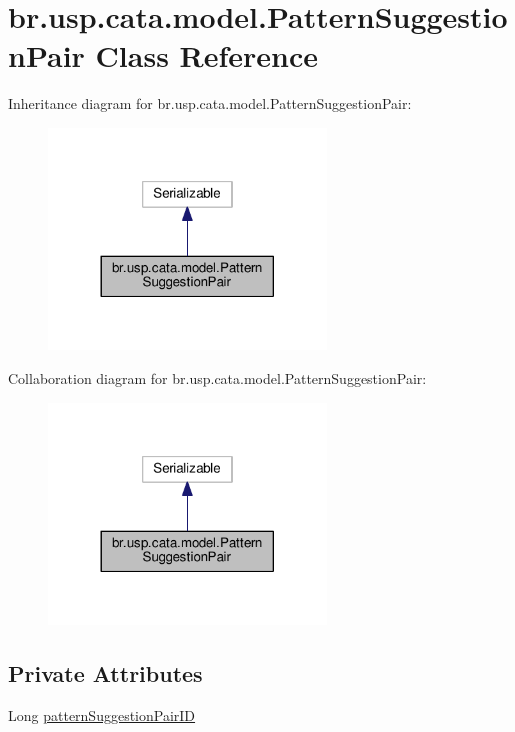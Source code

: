 \hypertarget{classbr_1_1usp_1_1cata_1_1model_1_1_pattern_suggestion_pair}{\section{br.\+usp.\+cata.\+model.\+Pattern\+Suggestion\+Pair Class Reference}
\label{classbr_1_1usp_1_1cata_1_1model_1_1_pattern_suggestion_pair}
}


Inheritance diagram for br.\+usp.\+cata.\+model.\+Pattern\+Suggestion\+Pair\+:\nopagebreak
\begin{figure}[H]
\begin{center}
\leavevmode
\includegraphics[width=209pt]{classbr_1_1usp_1_1cata_1_1model_1_1_pattern_suggestion_pair__inherit__graph}
\end{center}
\end{figure}


Collaboration diagram for br.\+usp.\+cata.\+model.\+Pattern\+Suggestion\+Pair\+:\nopagebreak
\begin{figure}[H]
\begin{center}
\leavevmode
\includegraphics[width=209pt]{classbr_1_1usp_1_1cata_1_1model_1_1_pattern_suggestion_pair__coll__graph}
\end{center}
\end{figure}
\subsection*{Private Attributes}
\begin{DoxyCompactItemize}
\item 
Long \hyperlink{classbr_1_1usp_1_1cata_1_1model_1_1_pattern_suggestion_pair_a222c6b815086b1143ffde77952db85bf}{pattern\+Suggestion\+Pair\+I\+D}
\end{DoxyCompactItemize}
